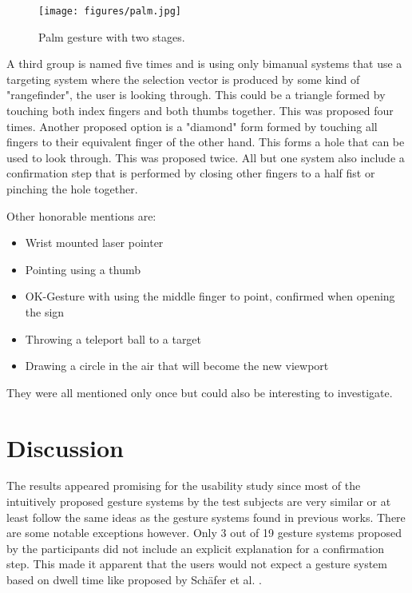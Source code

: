 \begin{figure}[!ht]
    \centering
    \texttt{[image: figures/palm.jpg]}
    \caption{Palm gesture with two stages.}
    \label{fig:palm2}
\end{figure}

A third group is named five times and is using only bimanual systems that use a targeting system where the selection vector is produced by some kind of "rangefinder", the user is looking through. This could be a triangle formed by touching both index fingers and both thumbs together. This was proposed four times. Another proposed option is a "diamond" form formed by touching all fingers to their equivalent finger of the other hand. This forms a hole that can be used to look through. This was proposed twice. All but one system also include a confirmation step that is performed by closing other fingers to a half fist or pinching the hole together.

Other honorable mentions are:
\begin{itemize}
    \item Wrist mounted laser pointer
    \item Pointing using a thumb
    \item OK-Gesture with using the middle finger to point, confirmed when opening the sign
    \item Throwing a teleport ball to a target
    \item Drawing a circle in the air that will become the new viewport
\end{itemize}

They were all mentioned only once but could also be interesting to investigate.

\section{Discussion}
The results appeared promising for the usability study since most of the intuitively proposed gesture systems by the test subjects are very similar or at least follow the same ideas as the gesture systems found in previous works. There are some notable exceptions however. Only 3 out of 19 gesture systems proposed by the participants did not include an explicit explanation for a confirmation step. This made it apparent that the users would not expect a gesture system based on dwell time like proposed by Schäfer et al. \cite{Schafer2021}.